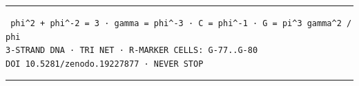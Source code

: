\bigskip
\noindent\rule{\linewidth}{0.4pt}

\begin{center}
\texttt{%
phi\^{}2 + phi\^{}-2 = 3 ·
gamma = phi\^{}-3 ·
C = phi\^{}-1 ·
G = pi\^{}3 gamma\^{}2 / phi \\[2pt]
3-STRAND DNA · TRI NET · R-MARKER CELLS: G-77..G-80 \\[2pt]
DOI 10.5281/zenodo.19227877 · NEVER STOP%
}
\end{center}

\noindent\rule{\linewidth}{0.4pt}

